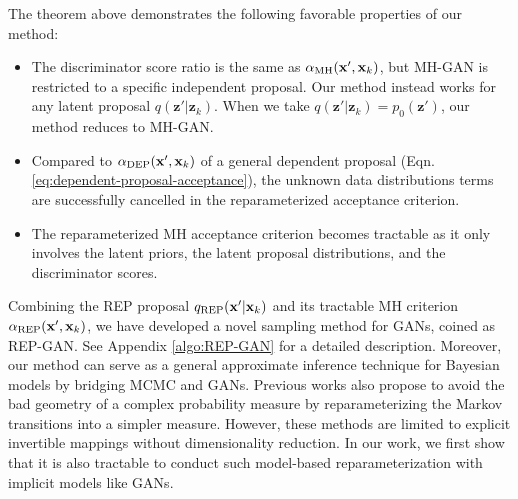 \documentclass[runningheads]{llncs}
\newcommand{\bx}{\mathbf{x}}
\newcommand{\bz}{\mathbf{z}}
\newcommand{\cX}{\mathcal{X}}
\newcommand{\<}{\left\langle}
\renewcommand{\>}{\right\rangle}
\begin{document}
The theorem above demonstrates the following favorable properties of our method:
\begin{itemize}
\item The discriminator score ratio is the same as $\alpha_{\rm MH}(\bx',\bx_k)$, but MH-GAN is restricted to a specific independent proposal. Our method instead works for any latent proposal $q(\bz'|\bz_k)$. When we take $q(\bz'|\bz_k)=p_0(\bz')$, our method reduces to MH-GAN. 
\item Compared to $\alpha_{\rm DEP}(\bx',\bx_k)$ of a general dependent proposal (Eqn. \eqref{eq:dependent-proposal-acceptance}), the unknown data distributions terms are successfully cancelled in the reparameterized acceptance criterion.
\item The reparameterized MH acceptance criterion becomes tractable as it only involves the latent priors, the latent proposal distributions, and the discriminator scores.
\end{itemize}

Combining the REP proposal $q_{\rm REP}(\bx'|\bx_k)$ and its tractable MH criterion $\alpha_{\rm REP}(\bx',\bx_k)$, we have developed a novel sampling method for GANs, coined as REP-GAN. See Appendix \ref{algo:REP-GAN} for a detailed description.
Moreover, our method can serve as a general approximate inference technique for Bayesian models by bridging MCMC and GANs. Previous works \cite{marzouk2016introduction,titsias2017learning,hoffman2019neutra} also propose to avoid the bad geometry of a complex probability measure by reparameterizing the Markov transitions into a simpler measure. However, these methods are limited to explicit invertible mappings without dimensionality reduction.
In our work, we first show that it is also tractable to conduct such model-based reparameterization with implicit models like GANs. 



\end{document}
